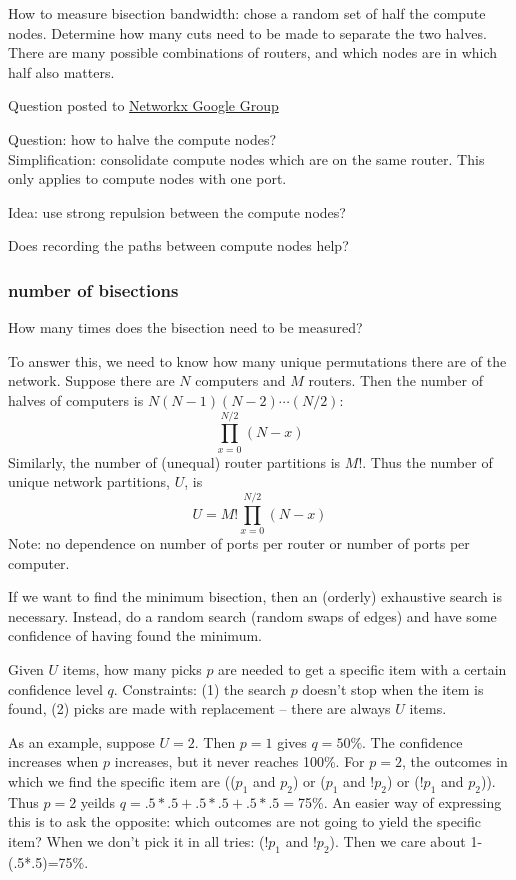 \documentclass[pdftex]{article}
\begin{document}
How to measure bisection bandwidth: chose a random set of half the compute nodes. Determine how many cuts need to be made to separate the two halves. There are many possible combinations of routers, and which nodes are in which half also matters.

Question posted to \href{https://groups.google.com/d/topic/networkx-discuss/hv_SzY-uaTw/discussion}{Networkx Google Group}

Question: how to halve the compute nodes?\\

Simplification: consolidate compute nodes which are on the same router. This only applies to compute nodes with one port.

Idea: use strong repulsion between the compute nodes?

Does recording the paths between compute nodes help?

\subsubsection{number of bisections}
How many times does the bisection need to be measured?

To answer this, we need to know how many unique permutations there are of the network. Suppose there are $N$ computers and $M$ routers. Then the number of halves of computers is $N(N-1)(N-2)\cdots(N/2)$:
\begin{equation}
 \prod_{x=0}^{N/2}(N-x)
\end{equation}
Similarly, the number of (unequal) router partitions is $M!$. Thus the number of unique network partitions, $U$, is
\begin{equation}
 U = M! \prod_{x=0}^{N/2}(N-x)
\end{equation}
Note: no dependence on number of ports per router or number of ports per computer.

If we want to find the minimum bisection, then an (orderly) exhaustive search is necessary. Instead, do a random search (random swaps of edges) and have some confidence of having found the minimum.

Given $U$ items, how many picks $p$ are needed to get a specific item with a certain confidence level $q$. Constraints: (1) the search $p$ doesn't stop when the item is found, (2) picks are made with replacement -- there are always $U$ items.

As an example, suppose $U=2$. Then $p=1$ gives $q=50\%$. The confidence increases when $p$ increases, but it never reaches 100\%. For $p=2$, the outcomes in which we find the specific item are
 (($p_1$ and $p_2$) or ($p_1$ and $!p_2$) or ($!p_1$ and $p_2$)). Thus $p=2$ yeilds $q=.5*.5+.5*.5+.5*.5=$75\%. An easier way of expressing this is to ask the opposite: which outcomes are not going to yield the specific item? When we don't pick it in all tries: ($!p_1$ and $!p_2$). Then we care about 1-(.5*.5)=75\%.
\end{document}
